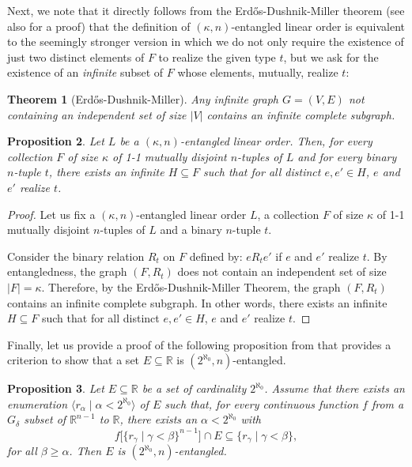\documentclass[12pt]{amsart}
\newtheorem{theorem}{Theorem}[section]
\newtheorem{proposition}[theorem]{Proposition}
\theoremstyle{definition}
\theoremstyle{remark}
\begin{document}
Next, we note that it directly follows from the Erd\H{o}s-Dushnik-Miller theorem \cite{MR4862} (see also \cite[Theorem 9.7]{MR1940513} for a proof) that the definition of $(\kappa, n)$-entangled linear order is equivalent to the seemingly stronger version in which we do not only require the existence of just two distinct elements of $F$ to realize the given type $t$, but we ask for the existence of an \emph{infinite} subset of $F$ whose elements, mutually, realize $t$:
\begin{theorem}[Erd\H{o}s-Dushnik-Miller]
Any infinite graph $G = (V, E)$ not containing an independent set of size $|V|$ contains an infinite complete subgraph.
\end{theorem}
\begin{proposition}
Let $L$ be a $(\kappa, n)$-entangled linear order. Then, for every collection $F$ of size $\kappa$ of 1-1 mutually disjoint $n$-tuples of $L$ and for every binary $n$-tuple $t$, there exists an infinite $H\subseteq F$ such that for all distinct $e,e' \in H$, $e$ and $e'$ realize $t$.
\end{proposition}
\begin{proof}
Let us fix a $(\kappa, n)$-entangled linear order $L$, a collection $F$ of size $\kappa$ of 1-1 mutually disjoint $n$-tuples of $L$ and a binary $n$-tuple $t$.

Consider the binary relation $R_t$ on $F$ defined by: $e \mathrel{R_t} e'$ if $e$ and $e'$ realize $t$. By entangledness, the graph $(F, R_t)$ does not contain an independent set of size $|F| = \kappa$. Therefore, by the Erd\H{o}s-Dushnik-Miller Theorem, the graph $(F, R_t)$ contains an infinite complete subgraph. In other words, there exists an infinite $H\subseteq F$ such that for all distinct $e,e' \in H$, $e$ and $e'$ realize $t$.
\end{proof}


Finally, let us provide a proof of the following proposition from \cite[\S 1]{MR799818} that provides a criterion to show that a set $E\subseteq \mathbb{R}$ is $(2^{\aleph_0}, n)$-entangled.

\begin{proposition}\label{prop:criterionforentangledness}
Let $E\subseteq \mathbb{R}$ be a set of cardinality $2^{\aleph_0}$. Assume that there exists an enumeration $\langle r_\alpha \mid \alpha < 2^{\aleph_0}\rangle$ of $E$ such that, for every continuous function $f$ from a $G_\delta$ subset of $\mathbb{R}^{n-1}$ to $\mathbb{R}$,
there exists an $\alpha < 2^{\aleph_0}$ with
\begin{equation}\label{eq:criterionforentangledness}
f\big[\{r_\gamma \mid \gamma < \beta\}^{n-1}\big] \cap E \subseteq \{r_\gamma \mid \gamma < \beta\},
\end{equation}
for all $\beta \ge \alpha$. Then $E$ is $(2^{\aleph_0},n)$-entangled.
\end{proposition}
\end{document}
